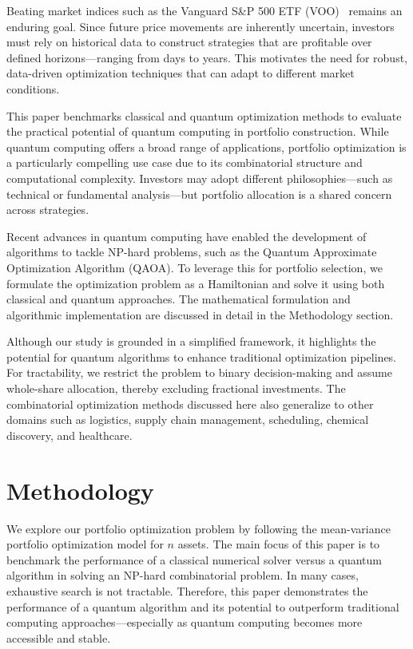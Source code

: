 \documentclass[12pt]{article}
\begin{document}
Beating market indices such as the Vanguard S\&P 500 ETF (VOO)~\cite{Vanguard_VOO} remains an enduring goal. Since future price movements are inherently uncertain, investors must rely on historical data to construct strategies that are profitable over defined horizons—ranging from days to years. This motivates the need for robust, data-driven optimization techniques that can adapt to different market conditions.

This paper benchmarks classical and quantum optimization methods to evaluate the practical potential of quantum computing in portfolio construction. While quantum computing offers a broad range of applications, portfolio optimization is a particularly compelling use case due to its combinatorial structure and computational complexity. Investors may adopt different philosophies—such as technical or fundamental analysis—but portfolio allocation is a shared concern across strategies.

Recent advances in quantum computing have enabled the development of algorithms to tackle NP-hard problems, such as the Quantum Approximate Optimization Algorithm (QAOA). To leverage this for portfolio selection, we formulate the optimization problem as a Hamiltonian and solve it using both classical and quantum approaches. The mathematical formulation and algorithmic implementation are discussed in detail in the Methodology section.

Although our study is grounded in a simplified framework, it highlights the potential for quantum algorithms to enhance traditional optimization pipelines. For tractability, we restrict the problem to binary decision-making and assume whole-share allocation, thereby excluding fractional investments. The combinatorial optimization methods discussed here also generalize to other domains such as logistics, supply chain management, scheduling, chemical discovery, and healthcare.


\section{Methodology}

We explore our portfolio optimization problem by following the mean-variance portfolio optimization model for $n$ assets. The main focus of this paper is to benchmark the performance of a classical numerical solver versus a quantum algorithm in solving an NP-hard combinatorial problem. In many cases, exhaustive search is not tractable. Therefore, this paper demonstrates the performance of a quantum algorithm and its potential to outperform traditional computing approaches—especially as quantum computing becomes more accessible and stable.
\end{document}
